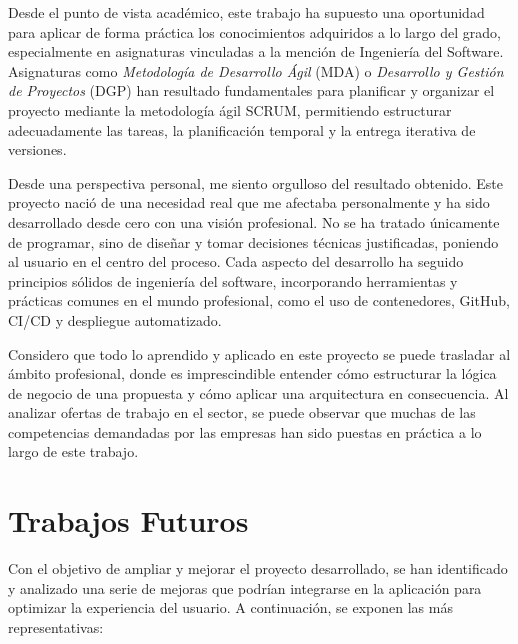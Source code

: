 Desde el punto de vista académico, este trabajo ha supuesto una oportunidad para aplicar de forma práctica los conocimientos adquiridos a lo largo del grado, especialmente en asignaturas vinculadas a la mención de Ingeniería del Software. Asignaturas como \textit{Metodología de Desarrollo Ágil} (MDA) o \textit{Desarrollo y Gestión de Proyectos} (DGP) han resultado fundamentales para planificar y organizar el proyecto mediante la metodología ágil SCRUM, permitiendo estructurar adecuadamente las tareas, la planificación temporal y la entrega iterativa de versiones.

Desde una perspectiva personal, me siento orgulloso del resultado obtenido. Este proyecto nació de una necesidad real que me afectaba personalmente y ha sido desarrollado desde cero con una visión profesional. No se ha tratado únicamente de programar, sino de diseñar y tomar decisiones técnicas justificadas, poniendo al usuario en el centro del proceso. Cada aspecto del desarrollo ha seguido principios sólidos de ingeniería del software, incorporando herramientas y prácticas comunes en el mundo profesional, como el uso de contenedores, GitHub, CI/CD y despliegue automatizado.

Considero que todo lo aprendido y aplicado en este proyecto se puede trasladar al ámbito profesional, donde es imprescindible entender cómo estructurar la lógica de negocio de una propuesta y cómo aplicar una arquitectura en consecuencia. Al analizar ofertas de trabajo en el sector, se puede observar que muchas de las competencias demandadas por las empresas han sido puestas en práctica a lo largo de este trabajo.

\section{Trabajos Futuros}

Con el objetivo de ampliar y mejorar el proyecto desarrollado, se han identificado y analizado una serie de mejoras que podrían integrarse en la aplicación para optimizar la experiencia del usuario. A continuación, se exponen las más representativas:

